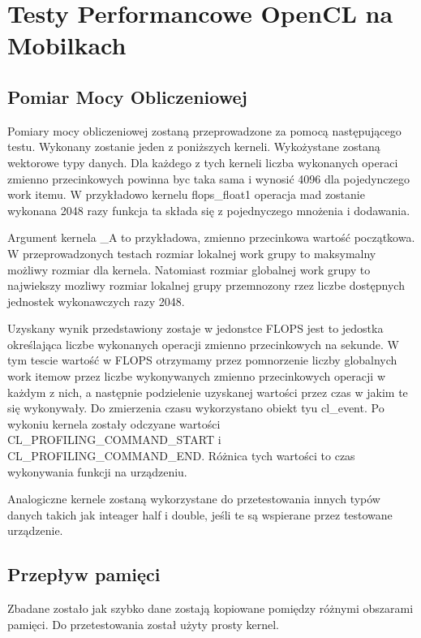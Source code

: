 \section[Testy Performancowe OpenCL na Mobilkach]{Testy Performancowe OpenCL na Mobilkach}

\subsection[Pomiar Mocy Obliczeniowej]{Pomiar Mocy Obliczeniowej}
Pomiary mocy obliczeniowej zostaną przeprowadzone za pomocą następującego testu.
Wykonany zostanie jeden z poniższych kerneli. Wykożystane zostaną wektorowe typy danych. Dla każdego z tych kerneli liczba wykonanych operaci zmienno przecinkowych powinna byc taka sama i wynosić 4096 dla pojedynczego work itemu. W przykładowo kernelu flops\_float1 operacja mad zostanie wykonana 2048 razy funkcja ta składa się z pojednyczego mnożenia i dodawania.



Argument kernela \_A to przykładowa, zmienno przecinkowa wartość początkowa. W przeprowadzonych testach rozmiar lokalnej work grupy to maksymalny możliwy rozmiar dla kernela. Natomiast rozmiar globalnej work grupy to najwiekszy mozliwy rozmiar lokalnej grupy przemnozony rzez liczbe dostępnych jednostek wykonawczych razy 2048.

Uzyskany wynik przedstawiony zostaje w jedonstce FLOPS jest to jedostka określająca liczbe wykonanych operacji zmienno przecinkowych na sekunde. W tym tescie wartość w FLOPS otrzymamy przez pomnorzenie liczby globalnych work itemow przez liczbe wykonywanych zmienno przecinkowych operacji w każdym z nich, a następnie podzielenie uzyskanej wartości przez czas w jakim te się wykonywały. Do zmierzenia czasu wykorzystano obiekt tyu cl\_event. Po wykoniu kernela zostały odczyane wartości CL\_PROFILING\_COMMAND\_START i CL\_PROFILING\_COMMAND\_END. Różnica tych wartości to czas wykonywania funkcji na urządzeniu.

Analogiczne kernele zostaną wykorzystane do przetestowania innych typów danych takich jak inteager half i double, jeśli te są wspierane przez testowane urządzenie.

\subsection[Przepływ pamięci]{Przepływ pamięci}
Zbadane zostało jak szybko dane zostają kopiowane pomiędzy różnymi obszarami pamięci. Do przetestowania został użyty prosty kernel.

